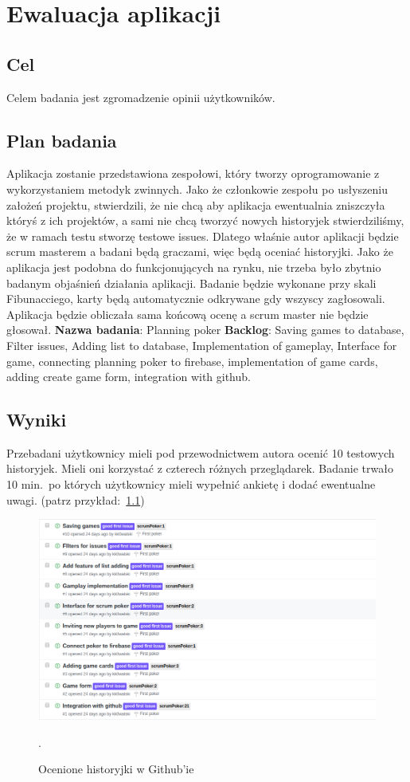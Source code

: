 \chapter{Ewaluacja aplikacji}

\section{Cel}

Celem badania jest zgromadzenie opinii użytkowników.

\section{Plan badania}

Aplikacja zostanie przedstawiona zespołowi,
który tworzy oprogramowanie z wykorzystaniem metodyk zwinnych.
Jako że członkowie zespołu po usłyszeniu założeń projektu, stwierdzili,
że nie chcą aby aplikacja ewentualnia zniszczyła któryś z ich projektów,
a sami nie chcą tworzyć nowych historyjek stwierdziliśmy,
że w ramach testu stworzę testowe issues.
Dlatego właśnie autor aplikacji będzie scrum masterem a badani będą graczami,
więc będą oceniać historyjki.
Jako że aplikacja jest podobna do funkcjonujących na rynku,
nie trzeba było zbytnio badanym objaśnień działania aplikacji.
Badanie będzie wykonane przy skali Fibunacciego,
karty będą automatycznie odkrywane gdy wszyscy zagłosowali.
 Aplikacja będzie obliczała sama końcową ocenę a scrum master nie będzie głosował.
 \textbf{Nazwa badania}: Planning poker
 \textbf{Backlog}: Saving games to database, Filter issues, Adding list to database,
 Implementation of gameplay, Interface for game, connecting planning poker to firebase,
implementation of game cards, adding create game form, integration with github.

\section{Wyniki}

Przebadani użytkownicy mieli pod przewodnictwem autora ocenić 10 testowych historyjek.
Mieli oni korzystać z czterech różnych przeglądarek.
Badanie trwało 10 min.\ po których użytkownicy mieli wypełnić ankietę i dodać ewentualne uwagi.
(patrz przykład:~\ref{rys:wynikBadania})
\begin{figure}
	\centering\includegraphics[width=.9\textwidth]{img/wynikBadania}
	\caption{Ocenione historyjki w Github'ie}.
~\label{rys:wynikBadania}
\end{figure}

